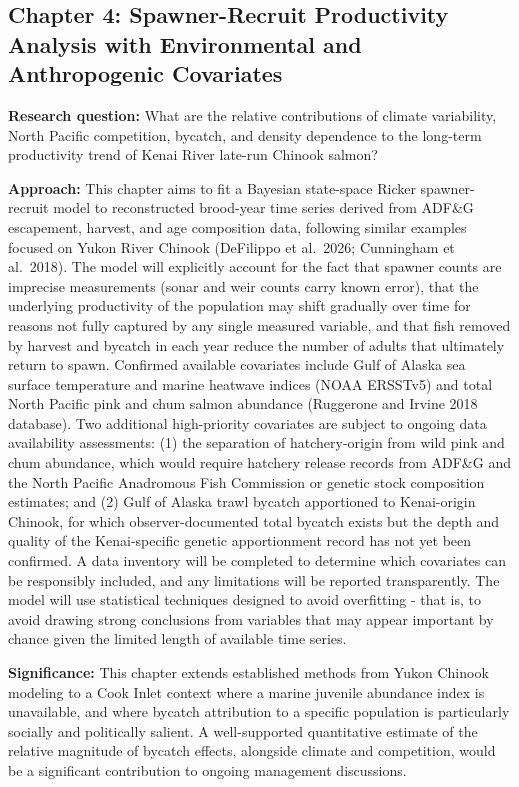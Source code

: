 \documentclass[
  letterpaper,
  DIV=11,
  numbers=noendperiod]{scrreprt}
\begin{document}
\subsection{Chapter 4: Spawner-Recruit Productivity Analysis with
Environmental and Anthropogenic
Covariates}\label{chapter-4-spawner-recruit-productivity-analysis-with-environmental-and-anthropogenic-covariates}

\textbf{Research question:} What are the relative contributions of
climate variability, North Pacific competition, bycatch, and density
dependence to the long-term productivity trend of Kenai River late-run
Chinook salmon?

\textbf{Approach:} This chapter aims to fit a Bayesian state-space
Ricker spawner-recruit model to reconstructed brood-year time series
derived from ADF\&G escapement, harvest, and age composition data,
following similar examples focused on Yukon River Chinook (DeFilippo et
al.~2026; Cunningham et al.~2018). The model will explicitly account for
the fact that spawner counts are imprecise measurements (sonar and weir
counts carry known error), that the underlying productivity of the
population may shift gradually over time for reasons not fully captured
by any single measured variable, and that fish removed by harvest and
bycatch in each year reduce the number of adults that ultimately return
to spawn. Confirmed available covariates include Gulf of Alaska sea
surface temperature and marine heatwave indices (NOAA ERSSTv5) and total
North Pacific pink and chum salmon abundance (Ruggerone and Irvine 2018
database). Two additional high-priority covariates are subject to
ongoing data availability assessments: (1) the separation of
hatchery-origin from wild pink and chum abundance, which would require
hatchery release records from ADF\&G and the North Pacific Anadromous
Fish Commission or genetic stock composition estimates; and (2) Gulf of
Alaska trawl bycatch apportioned to Kenai-origin Chinook, for which
observer-documented total bycatch exists but the depth and quality of
the Kenai-specific genetic apportionment record has not yet been
confirmed. A data inventory will be completed to determine which
covariates can be responsibly included, and any limitations will be
reported transparently. The model will use statistical techniques
designed to avoid overfitting - that is, to avoid drawing strong
conclusions from variables that may appear important by chance given the
limited length of available time series.

\textbf{Significance:} This chapter extends established methods from
Yukon Chinook modeling to a Cook Inlet context where a marine juvenile
abundance index is unavailable, and where bycatch attribution to a
specific population is particularly socially and politically salient. A
well-supported quantitative estimate of the relative magnitude of
bycatch effects, alongside climate and competition, would be a
significant contribution to ongoing management discussions.
\end{document}

